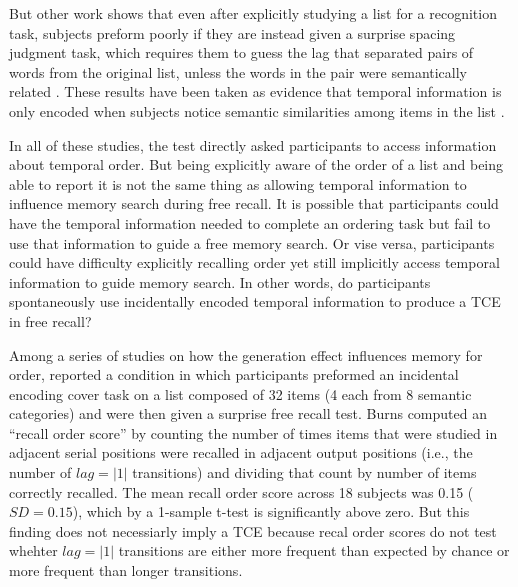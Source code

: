 \documentclass[man,natbib,floatsintext]{apa6} %
\begin{document}
But other work shows that even after explicitly studying a list for a recognition task, subjects preform poorly if they are instead given a surprise spacing judgment task, which requires them to guess the lag that separated pairs of words from the original list, unless the words in the pair were semantically related \citep{HintEtal75,HintBloc73}. These results have been taken as evidence that temporal information is only encoded when subjects notice semantic similarities among items in the list \citep[i.e., study phase retreival]{HintEtal75,HintBloc73,Hint16}.

\label{TODO-4}
In all of these studies, the test directly asked participants to access information about temporal order. But being explicitly aware of the order of a list and being able to report it is not the same thing as allowing temporal information to influence memory search during free recall. It is possible that participants could have the temporal information needed to complete an ordering task but fail to use that information to guide a free memory search. Or vise versa, participants could have difficulty explicitly recalling order yet still implicitly access temporal information to guide memory search. In other words, do participants spontaneously use incidentally encoded temporal information to produce a TCE in free recall? 

Among a series of studies on how the generation effect influences memory for order, \citet{Burn96} reported a condition in which participants preformed an incidental encoding cover task on a list composed of 32 items (4 each from 8 semantic categories) and were then given a surprise free recall test. Burns computed an ``recall order score'' by counting the number of times items that were studied in adjacent serial positions were recalled in adjacent output positions (i.e., the number of $lag=|1|$ transitions) and dividing that count by number of items correctly recalled.  The mean recall order score across 18 subjects was 0.15 ($SD = 0.15$), which by a 1-sample t-test is significantly above zero. But this finding does not necessiarly imply a TCE because recal order scores do not test whehter $lag=|1|$ transitions are either more frequent than expected by chance or more frequent than longer transitions.
\end{document}
